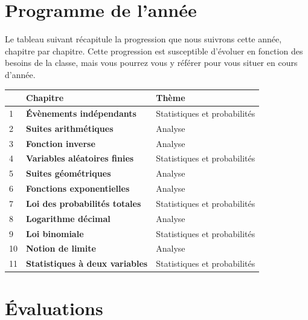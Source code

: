\documentclass[oneside,12pt]{article}          %
\begin{document}
\section{Programme de l'année}

Le tableau suivant récapitule la progression que nous suivrons cette année, chapitre par chapitre. Cette progression est susceptible d'évoluer en fonction des besoins de la classe, mais vous pourrez vous y référer pour vous situer en cours d'année.

\begin{center}
	\renewcommand{\arraystretch}{1.5}
	\begin{tabular}{| P{2cm} | P{8cm} | P{8cm} |} \hline
	\no & Chapitre & Thème \\ \hline \hline
		 1 & \textbf{Évènements indépendants} & Statistiques et probabilités	\\ \hline
		 2 & \textbf{Suites arithmétiques} & Analyse	\\ \hline
		 3 & \textbf{Fonction inverse}	 & Analyse	\\ \hline
		 4 & \textbf{Variables aléatoires finies} & Statistiques et probabilités	\\ \hline
		 5 & \textbf{Suites géométriques} & Analyse	\\ \hline
		 6 & \textbf{Fonctions exponentielles} & Analyse	\\ \hline
		 7 & \textbf{Loi des probabilités totales} & Statistiques et probabilités	\\ \hline
		 8 & \textbf{Logarithme décimal} & Analyse	\\ \hline
		 9 & \textbf{Loi binomiale} & Statistiques et probabilités	\\ \hline
		 10 & \textbf{Notion de limite}	 & Analyse	\\ \hline
		 11 & \textbf{Statistiques à deux variables} & Statistiques et probabilités	\\ \hline
	\end{tabular}
\end{center}



\section{Évaluations}
\end{document}
